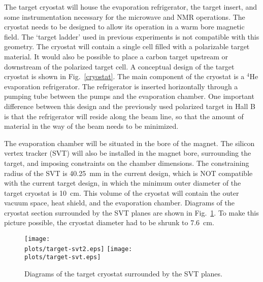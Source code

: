 The target cryostat will house the evaporation refrigerator, the target 
insert, and some instrumentation necessary for the microwave and NMR 
operations. The cryostat needs to be designed to allow its operation in a 
warm bore magnetic field. The `target ladder' used in previous experiments 
is not compatible with this geometry.  The cryostat will contain a single 
cell filled with a polarizable target material.  It would also be possible 
to place a carbon target upstream or downstream of the polarized target cell.
A conceptual design of the target cryostat is shown in Fig.~\ref{cryostat}.
The main component of the cryostat is a $^4$He evaporation refrigerator. 
The refrigerator is inserted horizontally through a pumping tube between the 
pumps and the evaporation chamber. One important difference between this 
design and the previously used polarized target in Hall B is that the 
refrigerator will reside along the beam line, so that the amount of 
material in the way of the beam needs to be minimized. 
 
The evaporation chamber will be situated in the bore of the magnet.  The 
silicon vertex tracker (SVT) will also be installed in the magnet bore, 
surrounding the target, and imposing constraints on the chamber dimensions. 
The constraining radius of the SVT is 40.25~mm in the current design, which 
is NOT compatible with the current target design, in which the minimum outer 
diameter of the target cryostat is 10~cm.  This volume of the cryostat will 
contain the outer vacuum space, heat shield, and the evaporation chamber. 
Diagrams of the cryostat section surrounded by the SVT planes are shown in 
Fig.~\ref{target-svt}. To make this picture possible, the cryostat diameter 
had to be shrunk to 7.6~cm.

\begin{figure}[htbp]
\centering
\texttt{[image: \\plots/target-svt2.eps]}
\texttt{[image: \\plots/target-svt.eps]}
\caption{\small{Diagrams of the target cryostat surrounded by the SVT 
planes.}}
\label{target-svt} 
\end{figure}

